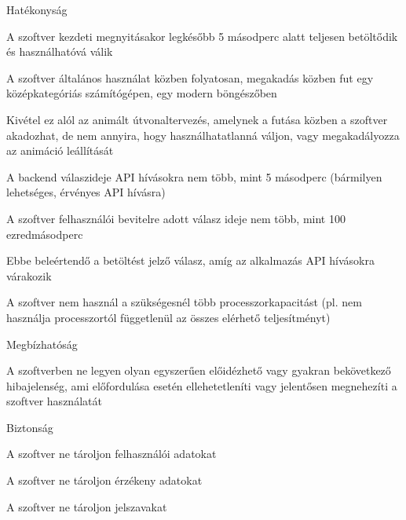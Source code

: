 \begin{enumerate}
    \item Hatékonyság
    \begin{compactitem}     
        \item A szoftver kezdeti megnyitásakor legkésőbb 5 másodperc alatt teljesen betöltődik és használhatóvá válik
        \item A szoftver általános használat közben folyatosan, megakadás közben fut egy középkategóriás számítógépen, egy modern böngészőben
        \begin{compactitem}     
            \item Kivétel ez alól az animált útvonaltervezés, amelynek a futása közben a szoftver akadozhat, de nem annyira, hogy használhatatlanná váljon, vagy megakadályozza az animáció leállítását
        \end{compactitem}
        \item A backend válaszideje API hívásokra nem több, mint 5 másodperc (bármilyen lehetséges, érvényes API hívásra)
        \item A szoftver felhasználói bevitelre adott válasz ideje nem több, mint 100 ezredmásodperc
        \begin{compactitem}     
            \item Ebbe beleértendő a betöltést jelző válasz, amíg az alkalmazás API hívásokra várakozik
        \end{compactitem}
        \item A szoftver nem használ a szükségesnél több processzorkapacitást (pl. nem használja processzortól függetlenül az összes elérhető teljesítményt)
    \end{compactitem}
    \item Megbízhatóság
    \begin{compactitem}
        \item A szoftverben ne legyen olyan egyszerűen előidézhető vagy gyakran bekövetkező hibajelenség, ami előfordulása esetén ellehetetleníti vagy jelentősen megnehezíti a szoftver használatát
    \end{compactitem}
    \item Biztonság
    \begin{compactitem}
        \item A szoftver ne tároljon felhasználói adatokat
        \item A szoftver ne tároljon érzékeny adatokat
        \item A szoftver ne tároljon jelszavakat
    \end{compactitem}

\end{enumerate}
